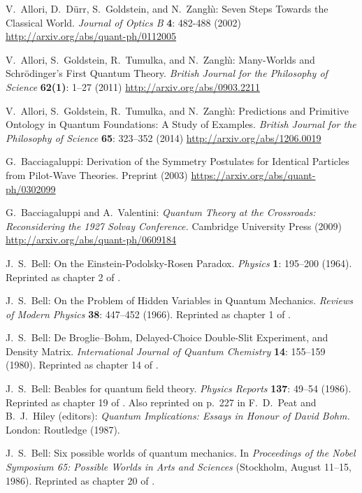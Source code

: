 \documentclass[12pt]{article}
\begin{document}
\begin{thebibliography}{20}

 V.~Allori, D.~D\"urr, S.~Goldstein, and N.~Zangh\`\i:
	Seven Steps Towards the Classical World.
	{\it Journal of Optics B} {\bf 4}: 482-488 (2002)
	\url{http://arxiv.org/abs/quant-ph/0112005}

 V.~Allori, S.~Goldstein, R.~Tumulka, and N.~Zangh\`\i:
	Many-Worlds and Schr\"odinger's First Quantum Theory.
	\textit{British Journal for the Philosophy of Science} \textbf{62(1)}: 1--27 (2011)
	\url{http://arxiv.org/abs/0903.2211}

 V.~Allori, S.~Goldstein, R.~Tumulka, and N.~Zangh\`\i:
	Predictions and Primitive Ontology in Quantum Foundations: A Study of Examples.	
	\textit{British Journal for the Philosophy of Science} \textbf{65}: 323--352 (2014)
	\url{http://arxiv.org/abs/1206.0019}

 G.~Bacciagaluppi:
	Derivation of the Symmetry Postulates for Identical Particles from Pilot-Wave Theories.
	Preprint (2003)
	\url{https://arxiv.org/abs/quant-ph/0302099}

 G.~Bacciagaluppi and A.~Valentini: 
	{\it Quantum Theory at the Crossroads: Reconsidering the 1927 Solvay Conference.} 
	Cambridge University Press (2009)
	\url{http://arxiv.org/abs/quant-ph/0609184} 

 J.~S.~Bell: 
	On the Einstein-Podolsky-Rosen Paradox.
	\textit{Physics} \textbf{1}: 195--200 (1964).
	Reprinted as chapter 2 of \cite{Bell87b}.

 J.~S.~Bell: 
	On the Problem of Hidden Variables in Quantum Mechanics.
	\textit{Reviews of Modern Physics} \textbf{38}: 447--452 (1966).
	Reprinted as chapter 1 of \cite{Bell87b}.

 J.~S.~Bell: 
	De Broglie--Bohm, Delayed-Choice Double-Slit Experiment, and Density Matrix.
	\textit{International Journal of Quantum Chemistry} \textbf{14}: 155--159 (1980). 
	Reprinted as chapter 14 of \cite{Bell87b}.

 J.~S.~Bell:
	Beables for quantum field theory.
	\textit{Physics Reports} \textbf{137}: 49--54 (1986).  
	Reprinted as chapter 19 of \cite{Bell87b}.  
	Also reprinted on p.~227 in F.~D.~Peat and B.~J.~Hiley (editors):
	\textit{Quantum Implications: Essays in Honour of David Bohm.} 
	London: Routledge (1987).

 J.~S.~Bell:
	Six possible worlds of quantum mechanics.
	In \textit{Proceedings of the Nobel Symposium 65: Possible Worlds in Arts and Sciences} (Stockholm, August 11--15, 1986). 
	Reprinted as chapter 20 of \cite{Bell87b}.


\end{thebibliography}
\end{document}
